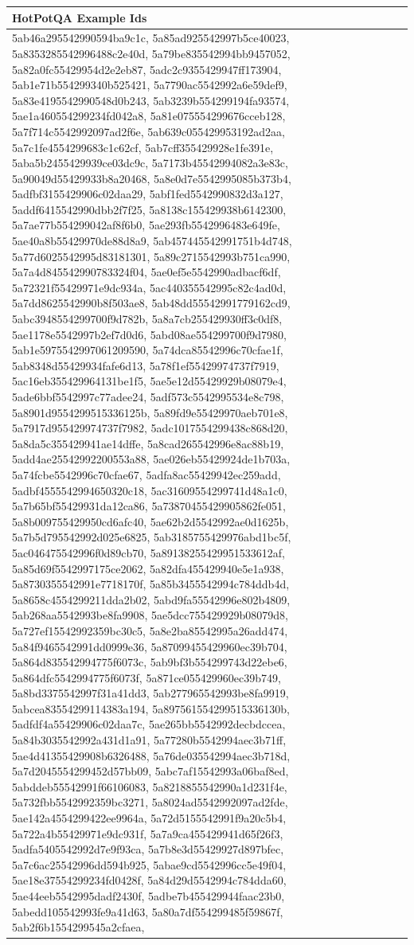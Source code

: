 \documentclass{article} %
\begin{document}
\begin{table}[h!]
    \centering
    \small %
    \begin{tabular}{|p{12cm}|} %
        \hline
        \textbf{HotPotQA Example Ids} \\
        \hline 
\tiny5ab46a295542990594ba9c1c, 5a85ad925542997b5ce40023, 5a8353285542996488c2e40d, 5a79be835542994bb9457052, 5a82a0fc55429954d2e2eb87, 5adc2c9355429947ff173904, 5ab1e71b554299340b525421, 5a7790ac5542992a6e59def9, 5a83e4195542990548d0b243, 5ab3239b554299194fa93574, 5ae1a460554299234fd042a8, 5a81e075554299676cceb128, 5a7f714c5542992097ad2f6e, 5ab639c055429953192ad2aa, 5a7c1fe4554299683c1c62cf, 5ab7cff355429928e1fe391e, 5aba5b2455429939ce03dc9c, 5a7173b45542994082a3e83c, 5a90049d55429933b8a20468, 5a8e0d7e5542995085b373b4, 5adfbf3155429906c02daa29, 5abf1fed5542990832d3a127, 5addf6415542990dbb2f7f25, 5a8138c155429938b6142300, 5a7ae77b554299042af8f6b0, 5ae293fb5542996483e649fe, 5ae40a8b55429970de88d8a9, 5ab457445542991751b4d748, 5a77d6025542995d83181301, 5a89c2715542993b751ca990, 5a7a4d845542990783324f04, 5ae0ef5e5542990adbacf6df, 5a72321f55429971e9dc934a, 5ac440355542995c82c4ad0d, 5a7dd8625542990b8f503ae8, 5ab48dd55542991779162cd9, 5abc3948554299700f9d782b, 5a8a7cb255429930ff3c0df8, 5ae1178e5542997b2ef7d0d6, 5abd08ae554299700f9d7980, 5ab1e5975542997061209590, 5a74dca85542996c70cfae1f, 5ab8348d55429934fafe6d13, 5a78f1ef55429974737f7919, 5ac16eb355429964131be1f5, 5ae5e12d55429929b08079e4, 5ade6bbf5542997c77adee24, 5adf573c5542995534e8c798, 5a8901d9554299515336125b, 5a89fd9e55429970aeb701e8, 5a7917d955429974737f7982, 5adc1017554299438c868d20, 5a8da5c355429941ae14dffe, 5a8cad265542996e8ac88b19, 5add4ae25542992200553a88, 5ae026eb55429924de1b703a, 5a74fcbe5542996c70cfae67, 5adfa8ac55429942ec259add, 5adbf4555542994650320c18, 5ac31609554299741d48a1c0, 5a7b65bf55429931da12ca86, 5a73870455429905862fe051, 5a8b009755429950cd6afc40, 5ae62b2d5542992ae0d1625b, 5a7b5d795542992d025e6825, 5ab3185755429976abd1bc5f, 5ac046475542996f0d89cb70, 5a89138255429951533612af, 5a85d69f5542997175ce2062, 5a82dfa455429940e5e1a938, 5a8730355542991e7718170f, 5a85b3455542994c784ddb4d, 5a8658c4554299211dda2b02, 5abd9fa55542996e802b4809, 5ab268aa5542993be8fa9908, 5ae5dcc755429929b08079d8, 5a727ef15542992359bc30c5, 5a8e2ba85542995a26add474, 5a84f9465542991dd0999e36, 5a87099455429960ec39b704, 5a864d835542994775f6073c, 5ab9bf3b554299743d22ebe6, 5a864dfc5542994775f6073f, 5a871ce055429960ec39b749, 5a8bd3375542997f31a41dd3, 5ab277965542993be8fa9919, 5abcea83554299114383a194, 5a897561554299515336130b, 5adfdf4a55429906c02daa7c, 5ae265bb5542992decbdccea, 5a84b3035542992a431d1a91, 5a77280b5542994aec3b71ff, 5ae4d41355429908b6326488, 5a76de035542994aec3b718d, 5a7d2045554299452d57bb09, 5abc7af15542993a06baf8ed, 5abddeb55542991f66106083, 5a8218855542990a1d231f4e, 5a732fbb5542992359bc3271, 5a8024ad5542992097ad2fde, 5ae142a4554299422ee9964a, 5a72d5155542991f9a20c5b4, 5a722a4b55429971e9dc931f, 5a7a9ca455429941d65f26f3, 5adfa5405542992d7e9f93ca, 5a7b8e3d55429927d897bfec, 5a7c6ac25542996dd594b925, 5abae9cd5542996cc5e49f04, 5ae18e37554299234fd0428f, 5a84d29d5542994c784dda60, 5ae44eeb5542995dadf2430f, 5adbe7b455429944faac23b0, 5abedd105542993fe9a41d63, 5a80a7df554299485f59867f, 5ab2f6b1554299545a2cfaea, 
\end{tabular}
\end{table}
\end{document}
